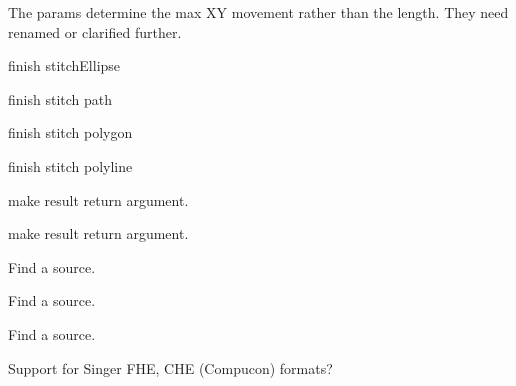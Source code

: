 \begin{DoxyRefList}
%
The params determine the max XY movement rather than the length. They need renamed or clarified further.  
\item[Member \mbox{\hyperlink{fill_8c_a63bc84e4406e59c092a2e076afedf930}{emb\+Pattern\+\_\+stitch\+Ellipse}} (Emb\+Pattern $\ast$p, Emb\+Ellipse ellipse, int thread\+\_\+index, int style)]\label{todo__todo000238}%
%
finish stitch\+Ellipse  
\item[Member \mbox{\hyperlink{fill_8c_a736fce5df010bbe74ea9ad2857be9bf4}{emb\+Pattern\+\_\+stitch\+Path}} (Emb\+Pattern $\ast$p, Emb\+Path path, int thread\+\_\+index, int style)]\label{todo__todo000239}%
%
finish stitch path  
\item[Member \mbox{\hyperlink{fill_8c_a86f903495c0da7514294200680bd6414}{emb\+Pattern\+\_\+stitch\+Polygon}} (Emb\+Pattern $\ast$p, Emb\+Polygon polygon, int thread\+\_\+index, int style)]\label{todo__todo000240}%
%
finish stitch polygon  
\item[Member \mbox{\hyperlink{fill_8c_a9ae9d5d7dfbb2ab361dc37970b7eb2f2}{emb\+Pattern\+\_\+stitch\+Polyline}} (Emb\+Pattern $\ast$p, Emb\+Polyline polyline, int thread\+\_\+index, int style)]\label{todo__todo000241}%
%
finish stitch polyline  
\item[Member \mbox{\hyperlink{vector_8c_a0a4af07bfac410623cf77a35a11550b1}{emb\+Vector\+\_\+multiply}} (Emb\+Vector vector, Emb\+Real magnitude, Emb\+Vector $\ast$result)]\label{todo__todo000257}%
%
make result return argument.  
\item[Member \mbox{\hyperlink{vector_8c_aaad72d90c58592e330de08139aee5077}{emb\+Vector\+\_\+normalize}} (Emb\+Vector vector, Emb\+Vector $\ast$result)]\label{todo__todo000256}%
%
make result return argument.  
\item[File \mbox{\hyperlink{format__art_8c}{format\+\_\+art.c}} ]\label{todo__todo000258}%
%
Find a source.  
\item[File \mbox{\hyperlink{format__bmc_8c}{format\+\_\+bmc.c}} ]\label{todo__todo000259}%
%
Find a source.  
\item[File \mbox{\hyperlink{format__cnd_8c}{format\+\_\+cnd.c}} ]\label{todo__todo000260}%
%
Find a source.  
\item[Page \mbox{\hyperlink{formats}{Formats}} ]\label{todo__todo000214}%
%
Support for Singer FHE, CHE (Compucon) formats?


\end{DoxyRefList}
